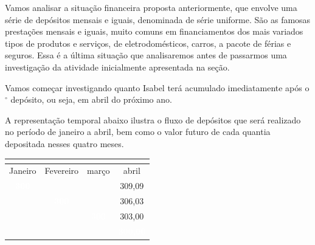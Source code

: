 \label{fin-arg-5}

Vamos analisar a situação financeira proposta anteriormente, que envolve uma série de depósitos mensais e iguais, denominada de série uniforme. São as famosas prestações mensais e iguais, muito comuns em financiamentos dos mais variados tipos de produtos e serviços, de eletrodomésticos, carros, a pacote de férias e seguros. Essa é a última situação que analisaremos antes de passarmos uma investigação da atividade inicialmente apresentada na seção.

Vamos começar investigando quanto Isabel terá acumulado imediatamente após o $^{\circ}$ depósito, ou seja, em abril do próximo ano.

A representação temporal abaixo ilustra o fluxo de depósitos que será realizado no período de janeiro a abril, bem como o valor futuro de cada quantia depositada nesses quatro meses.

\begin{table}[H]
\centering
\begin{tabu} to \textwidth {|c|c|c|c|}
\hline
{}\\
\hline
Janeiro & Fevereiro & março & abril \\
\hline
{}\textcolor{white}{\textbf{300}} & & & 309,09 \\
\hline
& \textcolor{white}{\textbf{300}} & & 
 306,03 \\
\hline 
& & \textcolor{white}{\textbf{300}} & 
 303{,}00 \\
 \hline
& & & \textcolor{white}{\textbf{300{,}00}}\\
\hline

\end{tabu}
\end{table}



